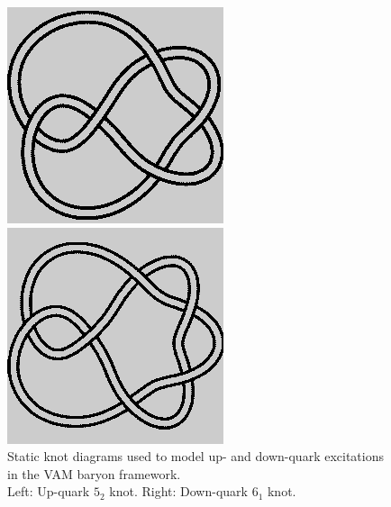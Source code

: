 \begin{figure}[H]
\centering
\begin{minipage}{0.45\textwidth}
    \centering
        \includegraphics[width=\textwidth]{images/5_2.png}
\end{minipage}
\hfill
\begin{minipage}{0.45\textwidth}
    \centering
        \includegraphics[width=\textwidth]{images/6_1.png}
\end{minipage}
    \caption{Static knot diagrams used to model up- and down-quark excitations in the VAM baryon framework.\\
            Left: Up-quark \(5_2\) knot. Right: Down-quark \(6_1\) knot.}
\end{figure}


